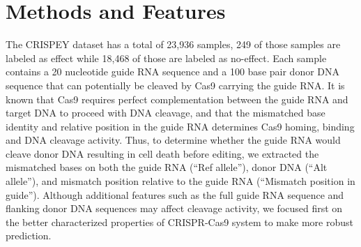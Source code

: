 \documentclass[journal]{IEEEtran}
\begin{document}
\section*{Methods and Features}
The CRISPEY dataset has a total of  23,936 samples, 249 of those samples are labeled as effect while 18,468 of those are labeled as no-effect. Each sample contains a 20 nucleotide guide RNA sequence and a 100 base pair donor DNA sequence that can potentially be cleaved by Cas9 carrying the guide RNA. It is known that Cas9 requires perfect complementation between the guide RNA and target DNA to proceed with DNA cleavage, and that the mismatched base identity and relative position in the guide RNA determines Cas9 homing, binding and DNA cleavage activity. Thus, to determine whether the guide RNA would cleave donor DNA resulting in cell death before editing, we extracted the mismatched bases on both the guide RNA (“Ref allele”), donor DNA (“Alt allele”), and mismatch position relative to the guide RNA (“Mismatch position in guide”). Although additional features such as the full guide RNA sequence and flanking donor DNA sequences may affect cleavage activity, we focused first on the better characterized properties of CRISPR-Cas9 system to make more robust prediction.
\end{document}
